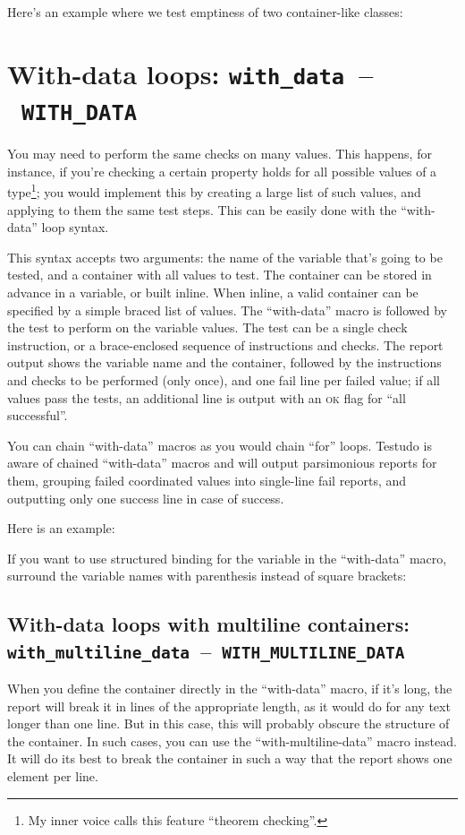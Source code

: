 \documentclass[twoside, a4paper, article]{memoir}
\newcommand*\testudocolor{\color{red!80!blue}}
\newcommand*\testudo[1]{\texttt{\testudocolor{}#1}}
\newcommand*\testudopair[2]{\testudo{#1}~--~\testudo{#2}}
\newcommand\chaptertestudopair[3]{%
  \chapter[#1]{#1: \testudopair{#2}{#3}}}
\newcommand\sectiontestudopair[3]{%
  \section[#1]{#1: \testudopair{#2}{#3}}}
\newcommand\typesetexampleandreport[1]{%
  \typesetexamplesource{#1}
  \typesetexamplereport{#1}
}
\providecommand\typesetexamplereport[1]{%
}
\providecommand\typesetexamplesource[1]{%
}
\begin{document}
Here's an example where we test emptiness of two container-like classes:

\typesetexampleandreport{test-aware-functions}


\chaptertestudopair{With-data loops}{with\_data}{WITH\_DATA}
\label{cha:with-data-loops}

You may need to perform the same checks on many values.  This happens, for
instance, if you're checking a certain property holds for all possible values
of a type\footnote{My inner voice calls this feature ``theorem checking''.};
you would implement this by creating a large list of such values, and applying
to them the same test steps.  This can be easily done with the ``with-data''
loop syntax.

This syntax accepts two arguments: the name of the variable that's going to be
tested, and a container with all values to test.  The container can be stored
in advance in a variable, or built inline.  When inline, a valid container can
be specified by a simple braced list of values.  The ``with-data'' macro is
followed by the test to perform on the variable values.  The test can be a
single check instruction, or a brace-enclosed sequence of instructions and
checks.  The report output shows the variable name and the container, followed
by the instructions and checks to be performed (only once), and one fail line
per failed value; if all values pass the tests, an additional line is output
with an \textsc{ok} flag for ``all successful''.

You can chain ``with-data'' macros as you would chain ``for'' loops.  Testudo
is aware of chained ``with-data'' macros and will output parsimonious reports
for them, grouping failed coordinated values into single-line fail reports, and
outputting only one success line in case of success.

Here is an example:

\typesetexampleandreport{with-data}

If you want to use structured binding for the variable in the ``with-data''
macro, surround the variable names with parenthesis instead of square brackets:

\typesetexampleandreport{with-data-structured-binding}

\sectiontestudopair{With-data loops with multiline containers}%
  {with\_multiline\_data}{WITH\_MULTILINE\_DATA}

When you define the container directly in the ``with-data'' macro, if it's
long, the report will break it in lines of the appropriate length, as it would
do for any text longer than one line.  But in this case, this will probably
obscure the structure of the container.  In such cases, you can use the
``with-multiline-data'' macro instead.  It will do its best to break the
container in such a way that the report shows one element per line.
\end{document}
